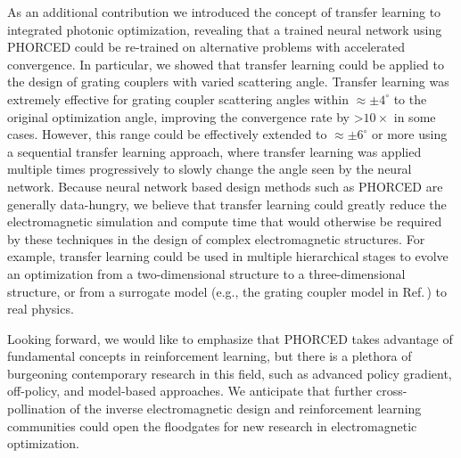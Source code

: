 \documentclass{article}
\begin{document}
As an additional contribution we introduced the concept of transfer learning to integrated photonic optimization, revealing that a trained neural network using PHORCED could be re-trained on alternative problems with accelerated convergence. In particular, we showed that transfer learning could be applied to the design of grating couplers with varied scattering angle. Transfer learning was extremely effective for grating coupler scattering angles within $\approx\pm4^\circ$ to the original optimization angle, improving the convergence rate by \textgreater $10\times$ in some cases. However, this range could be effectively extended to $\approx \pm 6^\circ$ or more using a sequential transfer learning approach, where transfer learning was applied multiple times progressively to slowly change the angle seen by the neural network. Because neural network based design methods such as PHORCED are generally data-hungry, we believe that transfer learning could greatly reduce the electromagnetic simulation and compute time that would otherwise be required by these techniques in the design of complex electromagnetic structures. For example, transfer learning could be used in multiple hierarchical stages to evolve an optimization from a two-dimensional structure to a three-dimensional structure, or from a surrogate model (e.g., the grating coupler model in Ref.\,\cite{gostimirovic_open-source_2019}) to real physics.

Looking forward, we would like to emphasize that PHORCED takes advantage of fundamental concepts in reinforcement learning, but there is a plethora of burgeoning contemporary research in this field, such as advanced policy gradient, off-policy, and model-based approaches. We anticipate that further cross-pollination of the inverse electromagnetic design and reinforcement learning communities could open the floodgates for new research in electromagnetic optimization.

\printbibliography



%
%
\end{document}
